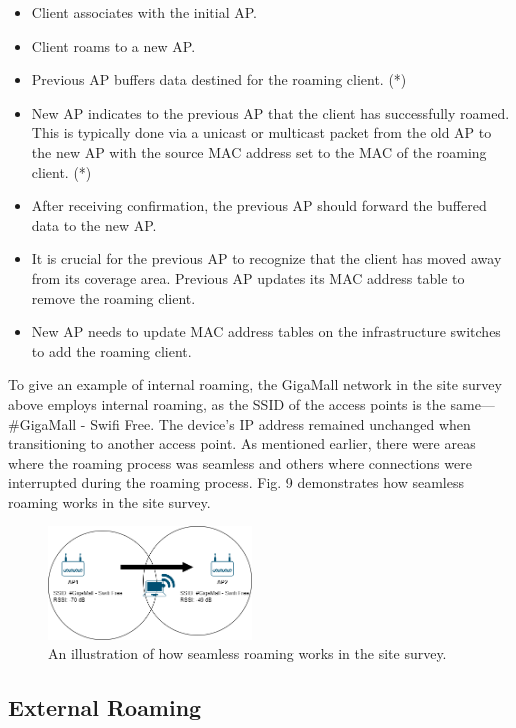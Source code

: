 \documentclass[conference]{IEEEtran}
\begin{document}
\begin{itemize}
    \item Client associates with the initial AP.
    \item Client roams to a new AP.
    \item Previous AP buffers data destined for the roaming client. (*) 
    \item New AP indicates to the previous AP that the client has successfully roamed. This is typically done via a unicast or multicast packet from the old AP to the new AP with the source MAC address set to the MAC of the roaming client. (*)
    \item After receiving confirmation, the previous AP should forward the buffered data to the new AP.
    \item It is crucial for the previous AP to recognize that the client has moved away from its coverage area. Previous AP updates its MAC address table to remove the roaming client.
    \item New AP needs to update MAC address tables on the infrastructure switches to add the roaming client.
\end{itemize}

To give an example of internal roaming, the GigaMall network in the site survey above employs internal roaming, as the SSID of the access points is the same—\#GigaMall - Swifi Free. The device's IP address remained unchanged when transitioning to another access point. As mentioned earlier, there were areas where the roaming process was seamless and others where connections were interrupted during the roaming process. Fig. 9 demonstrates how seamless roaming works in the site survey.

\begin{figure}[htbp]
    \centering
    \includegraphics[width=0.48\textwidth]{fig9_seamless_roaming_work.png}
    \caption{An illustration of how seamless roaming works in the site survey.}

\end{figure}

\subsection{External Roaming}
\end{document}
